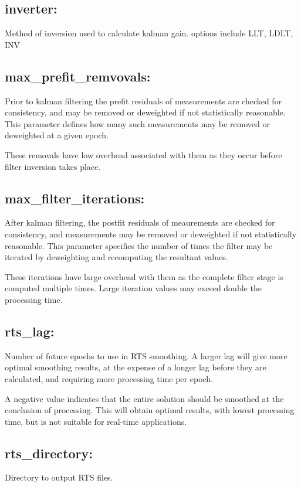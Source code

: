 \subsection{inverter:}
Method of inversion used to calculate kalman gain. options include 
LLT,
LDLT,
INV

\subsection{max\_prefit\_remvovals:}
Prior to kalman filtering the prefit residuals of measurements are checked for consistency, and may be removed or deweighted if not statistically reasonable. This parameter defines how many such measurements may be removed or deweighted at a given epoch.

These removals have low overhead associated with them as they occur before filter inversion takes place.

\subsection{max\_filter\_iterations:}
After kalman filtering, the postfit residuals of meaurements are checked for consistency, and measurements may be removed or deweighted if not statistically reasonable. This parameter specifies the number of times the filter may be iterated by deweighting and recomputing the resultant values.

These iterations have large overhead with them as the complete filter stage is computed multiple times. Large iteration values may exceed double the processing time.


\subsection{rts\_lag:}
Number of future epochs to use in RTS smoothing. A larger lag will give more optimal smoothing results, at the expense of a longer lag before they are calculated, and requiring more processing time per epoch.

A negative value indicates that the entire solution should be smoothed at the conclusion of processing. This will obtain optimal results, with lowest processing time, but is not suitable for real-time applications.

\subsection{rts\_directory:}
Directory to output RTS files.

